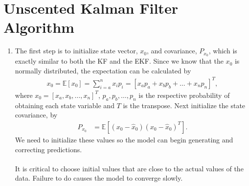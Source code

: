 \section{Unscented Kalman Filter Algorithm}

\begin{enumerate}
    \item The first step is to initialize state vector, $x_0$, and covariance, $P_{x_0}$, which is exactly similar to both the KF and the EKF. Since we know that the $x_0$ is normally distributed, the expectation can be calculated by
    \begin{align*}
    	x_0 = \mathbb{E}[x_0]   = \sum^n_{i = a} x_i p_i = [x_a p_a + x_b p_b + \hdots + x_n p_n]^T,
    \end{align*}
   where $x_0= [x_a, x_b, \hdots, x_n]^T$, $p_a, p_b, \hdots, p_n$  is the respective probability of obtaining each state variable and $T$ is the transpose. Next initialize the state covariance, by
    \begin{align*}
        P_{x_{0}} &= \mathbb{E}[(x_{0}-\hat{x}_{0})(x_{0}-\hat{x}_{0})^{T}].
    \end{align*}
\noindent We need to initialize these values so the model can begin generating and correcting predictions. \\ \\
    It is critical to choose initial values that are close to the actual values of the data. Failure to do causes the model to converge slowly.
    

\end{enumerate}
